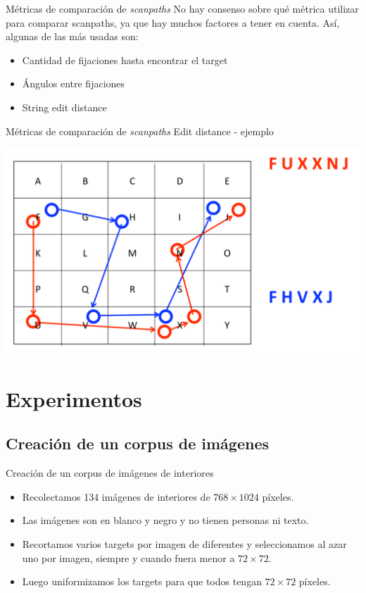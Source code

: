 \documentclass[compress]{beamer}
\begin{document}
\begin{frame}{Métricas de comparación de \textit{scanpaths}}
No hay consenso sobre qué métrica utilizar para comparar scanpaths, ya que hay muchos factores a tener en cuenta. Así, algunas de las más usadas son:
\begin{itemize}
\item Cantidad de fijaciones hasta encontrar el target
\item Ángulos entre fijaciones
\item String edit distance
\end{itemize}
\end{frame}

\begin{frame}{Métricas de comparación de \textit{scanpaths}}
{Edit distance - ejemplo}

\begin{center}
    \includegraphics[width=\linewidth]{images/edit-distance.png} 
\end{center}

\end{frame}


\section{Experimentos}
\subsection{Creación de un corpus de imágenes}
\begin{frame}{Creación de un corpus de imágenes de interiores}
\begin{itemize}
\item Recolectamos 134 imágenes de interiores de $768 \times 1024$ píxeles.
\item Las imágenes son en blanco y negro y no tienen personas ni texto.
\item Recortamos varios targets por imagen de diferentes y seleccionamos al azar uno por imagen, siempre y cuando fuera menor a $72 \times 72$.
\item Luego uniformizamos los targets para que todos tengan $72 \times 72$ píxeles.
\end{itemize}
\end{frame}
\end{document}
